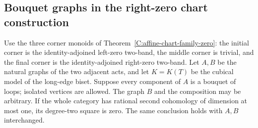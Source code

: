 \subsection{Bouquet graphs in the right-zero chart construction}

\begin{proposition}
\label{C:bouquet-chart-rank-one-square}
Use the three corner monoids of
Theorem~\ref{C:affine-chart-family-zero}: the initial corner is
the identity-adjoined left-zero two-band, the middle corner is
trivial, and the final corner is the identity-adjoined right-zero
two-band.  Let $A,B$ be the natural graphs of the two adjacent
acts, and let $K=K(T)$ be the cubical model of the long-edge
biset.  Suppose every component of $A$ is a bouquet of loops;
isolated vertices are allowed.  The graph $B$ and the composition
may be arbitrary.  If the whole category has rational second
cohomology of dimension at most one, its degree-two square is
zero.  The same conclusion holds with $A,B$ interchanged.
\end{proposition}

